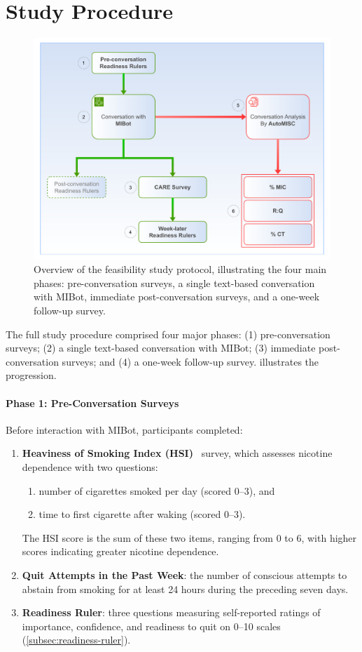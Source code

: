 \section{Study Procedure}
\begin{figure}[ht]
	\centering
	\includegraphics[width=0.9\linewidth]{fig/feasibility_study_flow.pdf}
	\caption[Feasibility Study Protocol Overview]{Overview of the feasibility study protocol, illustrating the four main phases: pre-conversation surveys, a single text-based conversation with MIBot, immediate post-conversation surveys, and a one-week follow-up survey.}
	\label{fig:study-flow}
\end{figure}

The full study procedure comprised four major phases: (1) pre-conversation surveys; (2) a single text-based conversation with MIBot; (3) immediate post-conversation surveys; and (4) a one-week follow-up survey.  illustrates the progression.

\paragraph{Phase 1: Pre-Conversation Surveys}
Before interaction with MIBot, participants completed:
\begin{enumerate}
	\item \textbf{Heaviness of Smoking Index (HSI)}~\citep{heatherton1989measuring} survey, which assesses nicotine dependence with two questions:
	      \begin{enumerate}
		      \item number of cigarettes smoked per day (scored 0--3), and
		      \item time to first cigarette after waking (scored 0--3).
	      \end{enumerate}
	      The HSI score is the sum of these two items, ranging from 0 to 6, with higher scores indicating greater nicotine dependence.
	\item \textbf{Quit Attempts in the Past Week}: the number of conscious attempts to abstain from smoking for at least 24 hours during the preceding seven days.
	\item \textbf{Readiness Ruler}: three questions measuring self-reported ratings of importance, confidence, and readiness to quit on 0--10 scales (\cref{subsec:readiness-ruler}).
\end{enumerate}


